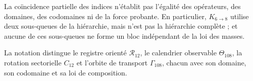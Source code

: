 La coïncidence partielle des indices n'établit pas l'égalité des opérateurs,
des domaines, des codomaines ni de la force probante. En particulier,
\(K_{6\to8}\) utilise deux sous-queues de la hiérarchie, mais n'est pas la hiérarchie
complète ; et aucune de ces sous-queues ne forme un bloc indépendant de la loi
des masses.

\begin{remark}
La notation distingue le registre orienté \(\mathcal R_{12}\), le
calendrier observable \(\Theta_{108}\), la rotation sectorielle \(C_{12}\) et
l'orbite de transport \(\Gamma_{108}\), chacun avec son domaine, son
codomaine et sa loi de composition.
\end{remark}
